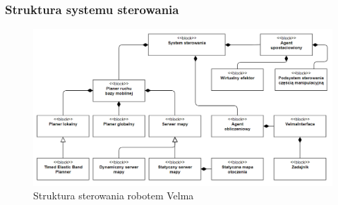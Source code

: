 \begin{frame}
    \frametitle{Struktura systemu sterowania} 
    \begin{figure}[b]
        \label{control_system}
        \centering
        \def\svgwidth{\columnwidth}
        \vspace{0.1cm}
        \includegraphics[scale=0.35]{images/control_system.png}
        \vspace{0.1cm}
        \caption{Struktura sterowania robotem Velma}
    \end{figure}
\end{frame}




